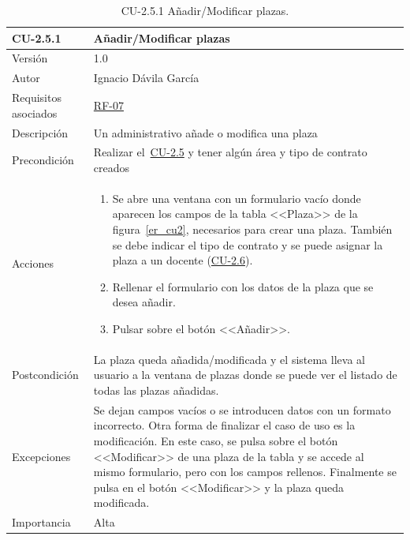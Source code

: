 \begin{table}[p]
	\centering
	\begin{tabularx}{\linewidth}{ p{} p{} }
		\toprule
		\textbf{CU-2.5.1}    & \textbf{Añadir/Modificar plazas}\\
		\toprule
		{\small Versión}              & 1.0    \\
		{\small Autor}                & Ignacio Dávila García \\
		{\small Requisitos asociados} & \hyperref[itm:RF7]{RF-07} \\
		{\small Descripción}          & Un administrativo añade o modifica una plaza \\
		{\small Precondición}         & Realizar el~\hyperref[table:CU-2_5]{CU-2.5} y tener algún área y tipo de contrato creados \\
		{\small Acciones}             &
		\begin{enumerate}
			\def\labelenumi{\arabic{enumi}.}
			\tightlist
			\item Se abre una ventana con un formulario vacío donde aparecen los campos de la tabla <<Plaza>> de la figura~\ref{er_cu2}, necesarios para crear una plaza. También se debe indicar el tipo de contrato y se puede asignar la plaza a un docente (\hyperref[table:CU-2_6]{CU-2.6}).
			\item Rellenar el formulario con los datos de la plaza que se desea añadir.
			\item Pulsar sobre el botón <<Añadir>>.
		\end{enumerate}\\
		{\small Postcondición}        & La plaza queda añadida/modificada y el sistema lleva al usuario a la ventana de plazas donde se puede ver el listado de todas las plazas añadidas. \\
		{\small Excepciones}          & Se dejan campos vacíos o se introducen datos con un formato incorrecto. Otra forma de finalizar el caso de uso es la modificación. En este caso, se pulsa sobre el botón <<Modificar>> de una plaza de la tabla y se accede al mismo formulario, pero con los campos rellenos. Finalmente se pulsa en el botón <<Modificar>> y la plaza queda modificada. \\
		{\small Importancia}          & Alta \\
		\bottomrule
	\end{tabularx}
	\caption{CU-2.5.1 Añadir/Modificar plazas.}\label{table:CU-2_5_1}
\end{table}
\FloatBarrier


